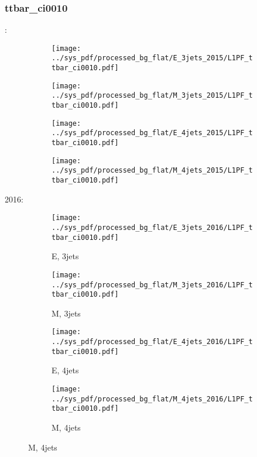 \documentclass{beamer}
\begin{document}
\begin{frame}
\frametitle{ttbar_ci0010}
\fontsize{5}{1}:
\begin{figure}
\centering
\begin{subfigure}[b]{0.24\textwidth}
\texttt{[image: ../sys\_pdf/processed\_bg\_flat/E\_3jets\_2015/L1PF\_ttbar\_ci0010.pdf]}
\end{subfigure}
\begin{subfigure}[b]{0.24\textwidth}
\texttt{[image: ../sys\_pdf/processed\_bg\_flat/M\_3jets\_2015/L1PF\_ttbar\_ci0010.pdf]}
\end{subfigure}
\begin{subfigure}[b]{0.24\textwidth}
\texttt{[image: ../sys\_pdf/processed\_bg\_flat/E\_4jets\_2015/L1PF\_ttbar\_ci0010.pdf]}
\end{subfigure}
\begin{subfigure}[b]{0.24\textwidth}
\texttt{[image: ../sys\_pdf/processed\_bg\_flat/M\_4jets\_2015/L1PF\_ttbar\_ci0010.pdf]}
\end{subfigure}
\end{figure}
2016:
\begin{figure}
\centering
\begin{subfigure}[b]{0.24\textwidth}
\texttt{[image: ../sys\_pdf/processed\_bg\_flat/E\_3jets\_2016/L1PF\_ttbar\_ci0010.pdf]}
\captionsetup{font=tiny}
\caption{E, 3jets}
\end{subfigure}
\begin{subfigure}[b]{0.24\textwidth}
\texttt{[image: ../sys\_pdf/processed\_bg\_flat/M\_3jets\_2016/L1PF\_ttbar\_ci0010.pdf]}
\captionsetup{font=tiny}
\caption{M, 3jets}
\end{subfigure}
\begin{subfigure}[b]{0.24\textwidth}
\texttt{[image: ../sys\_pdf/processed\_bg\_flat/E\_4jets\_2016/L1PF\_ttbar\_ci0010.pdf]}
\captionsetup{font=tiny}
\caption{E, 4jets}
\end{subfigure}
\begin{subfigure}[b]{0.24\textwidth}
\texttt{[image: ../sys\_pdf/processed\_bg\_flat/M\_4jets\_2016/L1PF\_ttbar\_ci0010.pdf]}
\captionsetup{font=tiny}
\caption{M, 4jets}
\end{subfigure}
\end{figure}
\end{frame}
\end{document}
